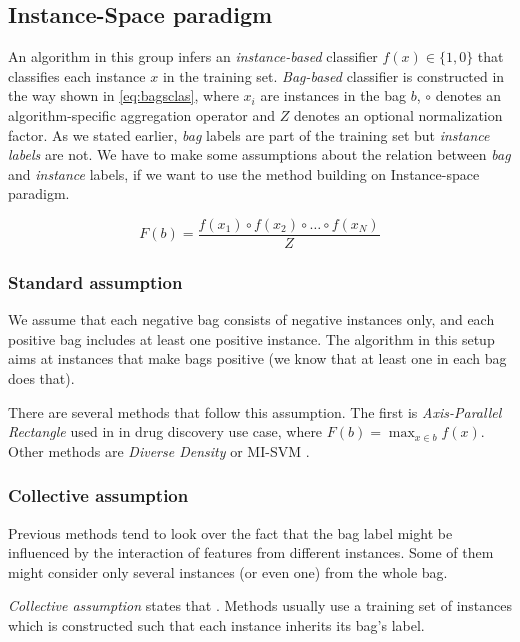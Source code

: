 \subsection{Instance-Space paradigm}
An algorithm in this group infers an \emph{instance-based} classifier $f(x) \in \{1,0\}$ that classifies each instance $x$ in the training set. \emph{Bag-based} classifier is constructed in the way shown in \ref{eq:bagsclas}, where $x_i$ are instances in the bag $b$, $\circ$ denotes an algorithm-specific aggregation operator and $Z$ denotes an optional normalization factor. As we stated earlier, \emph{bag} labels are part of the training set but \emph{instance labels} are not. We have to make some assumptions about the relation between \emph{bag} and \emph{instance} labels, if we want to use the method building on Instance-space paradigm.

\begin{equation} \label{eq:bagsclas}
    F(b)=\frac{f(x_1)\circ f(x_2)\circ\dots\circ f(x_N)}{Z}
\end{equation}

\subsubsection{Standard assumption}
We assume that each negative bag consists of negative instances only, and each positive bag includes at least one positive instance. The algorithm in this setup aims at instances that make bags positive (we know that at least one in each bag does that).

There are several methods that follow this assumption. The first is \emph{Axis-Parallel Rectangle} used in \cite{Dietterich1997} in drug discovery use case, where $F(b)=\max_{x\in b}f(x)$. Other methods are \emph{Diverse Density} \cite{Maron1998} or MI-SVM \cite{Andrews2003}.

\subsubsection{Collective assumption}
Previous methods tend to look over the fact that the bag label might be influenced by the interaction of features from different instances. Some of them might consider only several instances (or even one) from the whole bag.

\emph{Collective assumption} states that  \cite{Xu2003}. Methods usually use a training set of instances which is constructed such that each instance inherits its bag's label.

